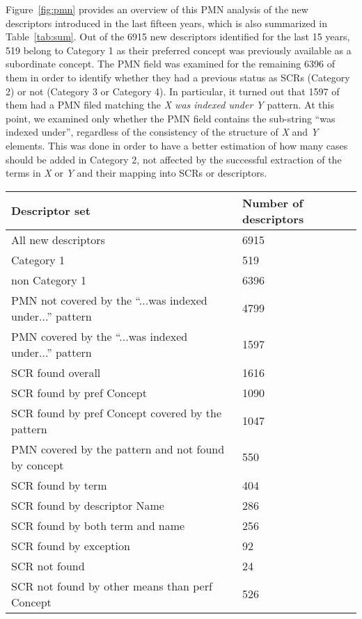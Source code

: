 Figure~\ref{fig:pmn} provides an overview of this PMN analysis of the new descriptors introduced in the last fifteen years, which is also summarized in Table~\ref{tab:sum}. 
Out of the 6915 new descriptors identified for the last 15 years, 519 belong to Category 1 as their preferred concept was previously available as a subordinate concept. The PMN field was examined for the remaining 6396 of them in order to identify whether they had a previous status as SCRs (Category 2) or not (Category 3 or Category 4). In particular, it turned out that 1597 of them had a PMN filed matching the \textit{X was indexed under Y} pattern. At this point, we examined only whether the PMN field contains the sub-string ``was indexed under'', regardless of the consistency of the structure of \textit{X} and \textit{Y} elements. This was done in order to have a better estimation of how many cases should be added in Category 2, not affected by the successful extraction of the terms in \textit{X} or \textit{Y} and their mapping into SCRs or descriptors.

\begin{table*}
\caption{Sets of new descriptors introduced in the last fifteen years in the context of harvesting their Public MeSH Note field.}
\label{tab:sum}       %
\centering
\begin{tabular}{ll}
\textbf{Descriptor set}   & \textbf{Number of descriptors}  		\\
\hline
All new descriptors   & 6915 		\\
Category 1    & 519  		\\
non Category 1    & 6396		\\
PMN not covered by the ``...was indexed under...'' pattern  & 4799		\\
PMN covered by the ``...was indexed under...'' pattern & 1597		\\
SCR found overall & 1616		\\
SCR found by pref Concept & 1090 \\
SCR found by pref Concept covered by the pattern & 1047 \\
PMN covered by the pattern and not found by concept & 550 \\
SCR found by term & 404 \\
SCR found by descriptor Name & 286 \\
SCR found by both term and name & 256 \\
SCR found by exception & 92 \\
SCR not found  & 24 \\
SCR not found by other means than perf Concept & 526 \\
\end{tabular}
\end{table*}

